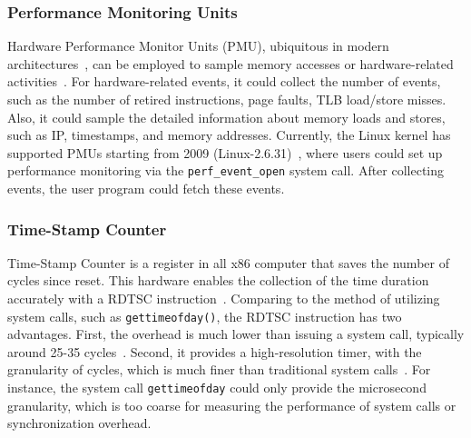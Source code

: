 \subsubsection{Performance Monitoring Units}
\label{sec:pmu}

Hardware Performance Monitor Units (PMU), ubiquitous in modern architectures~\cite{AMDIBS:07, IntelArch:PEBS:Sept09, armpmu}, can be employed to sample memory accesses or hardware-related activities~\cite{DBLP:conf/sc/ItzkowitzWAK03, ibs-sc, ibs-pact, Sheng:2011:RLN:1985793.1985848, LASER, Cheetah}. For hardware-related events, it could collect the number of events, such as the number of retired instructions, page faults, TLB load/store misses. Also, it could sample the detailed information about memory loads and stores, such as IP, timestamps, and memory addresses. Currently, the Linux kernel has supported PMUs starting from 2009 (Linux-2.6.31)~\cite{pmulinuxsupport}, where users could set up performance monitoring via  the \texttt{perf\_event\_open} system call. After collecting events, the user program could fetch these events. 

\subsubsection{Time-Stamp Counter}

\label{sec:rdtsc}

Time-Stamp Counter is a register in all x86 computer that saves the number of cycles since reset. This hardware enables the collection of the time duration accurately with a RDTSC instruction~\cite{coorporation1997using, weaver2013linux}. Comparing to the method of utilizing system calls, such as \texttt{gettimeofday()}, the RDTSC instruction has two advantages. First, the overhead is much lower than issuing a system call, typically around 25-35 cycles~\cite{rdtscoverhead}. Second, it provides a high-resolution timer, with the granularity of cycles, which is much finer than traditional system calls~\cite{pitfallsrdtsc}. For instance, the system call \texttt{gettimeofday} could only provide the microsecond granularity, which is too coarse for measuring the performance of system calls or synchronization overhead.  





